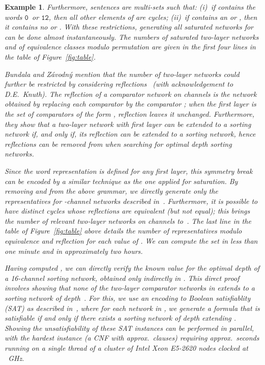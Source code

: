 \documentclass[10pt]{IEEEtran}
\newcommand{\sent}[1]{\ensuremath{\mathtt{#1}}} \newcommand{\GG}{{\cal G}}
\newtheorem{example}{Example}
\begin{document}
{{\begin{example}
Furthermore, sentences are multi-sets  such that:
(i)~if  contains the words \sent0\ or \sent{12}, then all other elements of
 are cycles;
(ii)~if  contains an  or , then it contains
no  or .
With these restrictions, generating all saturated networks for 
can be done almost instantaneously.  The numbers  of
saturated two-layer networks and  of equivalence classes
modulo permutation are given in the first four lines in the table of Figure~\ref{fig:table}.

Bundala and Z{\'a}vodn{\'y} mention that the number of two-layer
networks could further be restricted by considering
reflections~\cite{DBLP:conf/lata/BundalaZ14} (with acknowledgement to
D.E.~Knuth).  The reflection of a comparator network on  channels is
the network obtained by replacing each comparator  by the comparator
; when the first layer is the set  of
comparators of the form , reflection leaves it unchanged.
Furthermore, they show that a two-layer network with first layer  can
be extended to a sorting network if, and only if, its reflection can be
extended to a sorting network, hence reflections can be removed from
 when searching for optimal depth sorting networks. 

Since the word representation is defined for any first layer, this symmetry
break can be encoded by a similar technique as the one applied for saturation.
By removing  and  from the above grammar,
we directly generate only the  representatives for -channel networks described
in~\cite{DBLP:conf/lata/BundalaZ14}.  Furthermore, it is
possible to have distinct cycles whose reflections are equivalent
(but not equal); this brings the number
of relevant two-layer networks on  channels to~.  The last line in the table of
Figure~\ref{fig:table} above details the number  of representatives modulo equivalence
and reflection for each value of .  We can compute the set
 in less than one minute and  in approximately two hours.




Having computed , we can directly verify the known value  for the optimal depth of a 16-channel sorting network, obtained only indirectly in \cite{DBLP:conf/lata/BundalaZ14}.
This direct proof involves
showing that none of the 
two-layer comparator networks in  extends to a sorting network
of depth~. For this, we use an encoding to Boolean
satisfiablity (SAT) as described in~\cite{DBLP:conf/lata/BundalaZ14},
where for each network 
in , we generate a
formula 
that
is satisfiable if and only if there exists a
sorting network of depth 
extending .
Showing the unsatisfiability of these  SAT instances can be performed in
parallel, with the hardest instance (a CNF with approx.\  clauses) requiring approx.\  seconds running on a single thread of a cluster of Intel Xeon E5-2620 nodes clocked at ~GHz.




\end{example}}}
\end{document}
